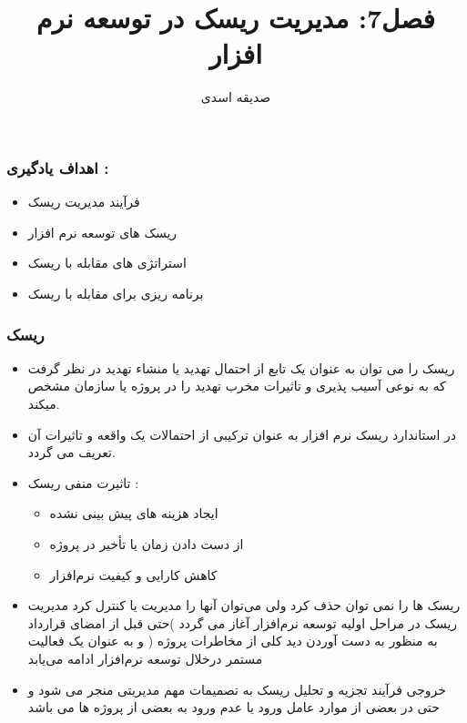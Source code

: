 \documentclass[xcolor=dvipsnames,professionalfonts]{beamer}
\author{صديقه اسدی}
\title{فصل7:  مديريت ريسک در توسعه نرم افزار}
\institute{دانشگاه پیام نور واحد تهران شمال}
\begin{document}
	\frame{\maketitle}
	\begin{frame}
	
		\frametitle{اهداف یادگیری :}
	
      \begin{itemize}
     
      
      	
     	\item فرآیند مدیریت ریسک 
     	\item ریسک های توسعه نرم افزار   
     	\item استراتژی های مقابله با ریسک
     	\item برنامه ریزی برای مقابله با ریسک
     \end{itemize}
	\end{frame}
\begin{frame}
	
	\frametitle{ریسک}
				
	\begin{itemize}
	
	    	\item ریسک را می توان به عنوان یک تابع از احتمال تهدید یا منشاء تهدید در نظر گرفت  که به نوعی آسیب پذیری و تاثیرات مخرب تهدید را در پروژه یا سازمان مشخص میکند. 
	    	\item در استاندارد  ریسک نرم افزار به عنوان ترکیبی از احتمالات یک واقعه و تاثیرات آن تعریف می گردد.
	    	\item 
		تاثیرت منفی ریسک :
		\begin{itemize}
			\item ایجاد هزینه های پیش بینی نشده
			\item 		از دست دادن زمان یا تأخیر در پروژه
			\item 		کاهش کارایی و کیفیت نرم‌افزار 
		\end{itemize}
		\item ریسک ها را نمی توان  حذف کرد ولی می‌توان آنها را مدیریت یا کنترل کرد
		مدیریت ریسک در مراحل اولیه توسعه نرم‌افزار آغاز می گردد )حتی قبل از امضای قرارداد به منظور به دست آوردن دید کلی از مخاطرات پروژه ( و به عنوان یک فعالیت مستمر درخلال توسعه نرم‌افزار ادامه می‌یابد
		\item خروجی فرآیند تجزیه و تحلیل ریسک  به تصمیمات مهم مدیریتی منجر می شود و حتی در بعضی از موارد عامل ورود یا عدم ورود به بعضی از پروژه ها می باشد
		
	\end{itemize}
\end{frame}
\end{document}
